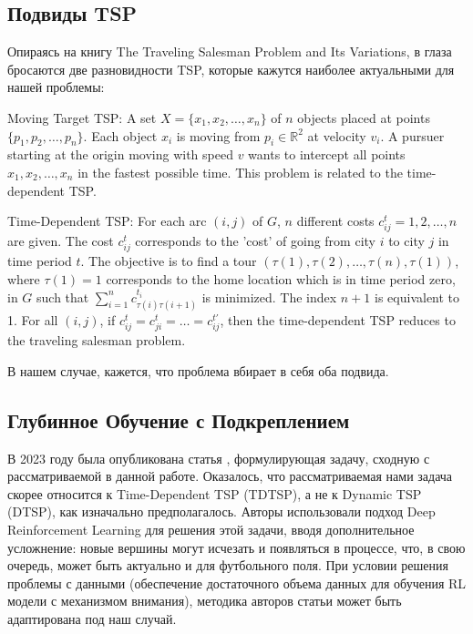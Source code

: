 \subsection{Подвиды TSP}
Опираясь на книгу The Traveling Salesman Problem and Its Variations, в глаза бросаются две разновидности TSP, которые кажутся наиболее актуальными для нашей проблемы:


{\color{blue}
Moving Target TSP: A set $X = \{x_1, x_2, \ldots, x_n\}$ of $n$ objects placed at points $\{p_1, p_2, \ldots, p_n\}$. Each object $x_i$ is moving from $p_i \in \mathbb{R}^2$ at velocity $v_i$. A pursuer starting at the origin moving with speed $v$ wants to intercept all points $x_1, x_2, \ldots, x_n$ in the fastest possible time. This problem is related to the time-dependent TSP.




Time-Dependent TSP: For each arc $(i, j)$ of $G$, $n$ different costs $c_{ij}^t = 1, 2, \ldots, n$ are given. The cost $c_{ij}^t$ corresponds to the 'cost' of going from city $i$ to city $j$ in time period $t$. The objective is to find a tour $(\tau(1), \tau(2), \ldots, \tau(n), \tau(1))$, where $\tau(1) = 1$ corresponds to the home location which is in time period zero, in $G$ such that $\sum_{i=1}^{n} c_{\tau(i) \tau(i+1)}^{t_i}$ is minimized. The index $n + 1$ is equivalent to 1. For all $(i, j)$, if $c_{ij}^t = c_{ji}^t = \ldots = c_{ij}^{t'}$, then the time-dependent TSP reduces to the traveling salesman problem.

}

В нашем случае, кажется, что проблема вбирает в себя оба подвида.

\subsection{Глубинное Обучение с Подкреплением}
В 2023 году была опубликована статья \cite{RL}, формулирующая задачу, сходную с рассматриваемой в данной работе. Оказалось, что рассматриваемая нами задача скорее относится к Time-Dependent TSP (TDTSP), а не к Dynamic TSP (DTSP), как изначально предполагалось. Авторы использовали подход Deep Reinforcement Learning для решения этой задачи, вводя дополнительное усложнение: новые вершины могут исчезать и появляться в процессе, что, в свою очередь, может быть актуально и для футбольного поля. При условии решения проблемы с данными (обеспечение достаточного объема данных для обучения RL модели с механизмом внимания), методика авторов статьи может быть адаптирована под наш случай.

